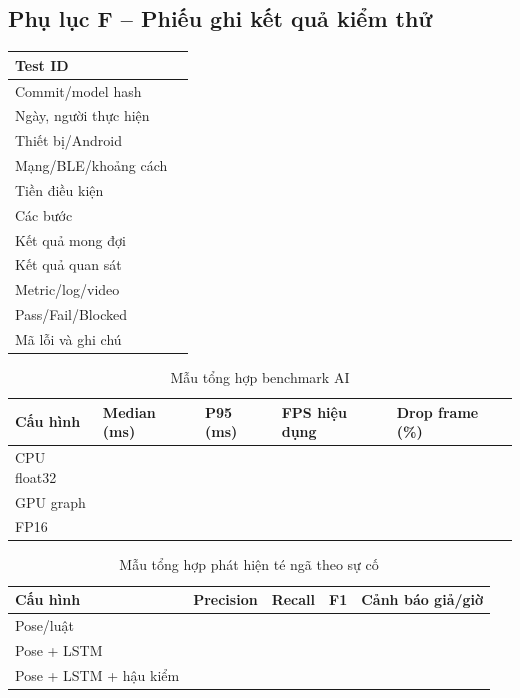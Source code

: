 \subsection*{Phụ lục F -- Phiếu ghi kết quả kiểm thử}

\begin{longtable}{|p{3.2cm}|p{10.2cm}|}
\hline
Test ID & \\
\hline
Commit/model hash & \\
\hline
Ngày, người thực hiện & \\
\hline
Thiết bị/Android & \\
\hline
Mạng/BLE/\allowbreak khoảng cách & \\
\hline
Tiền điều kiện & \\
\hline
Các bước & \\
\hline
Kết quả mong đợi & \\
\hline
Kết quả quan sát & \\
\hline
Metric/log/video & \\
\hline
Pass/Fail/Blocked & \\
\hline
Mã lỗi và ghi chú & \\
\hline
\end{longtable}

\begin{table}[htbp]
\centering
\caption{Mẫu tổng hợp benchmark AI}
\begin{tabularx}{\textwidth}{|p{3.2cm}|X|X|X|X|}
\hline
Cấu hình & Median (ms) & P95 (ms) & FPS hiệu dụng & Drop frame (\%) \\
\hline
CPU float32 & & & & \\
\hline
GPU graph & & & & \\
\hline
FP16 & & & & \\
\hline
\end{tabularx}
\end{table}

\begin{table}[htbp]
\centering
\caption{Mẫu tổng hợp phát hiện té ngã theo sự cố}
\begin{tabularx}{\textwidth}{|p{3.4cm}|X|X|X|X|}
\hline
Cấu hình & Precision & Recall & F1 & Cảnh báo giả/giờ \\
\hline
Pose/luật & & & & \\
\hline
Pose + LSTM & & & & \\
\hline
Pose + LSTM + hậu kiểm & & & & \\
\hline
\end{tabularx}
\end{table}

